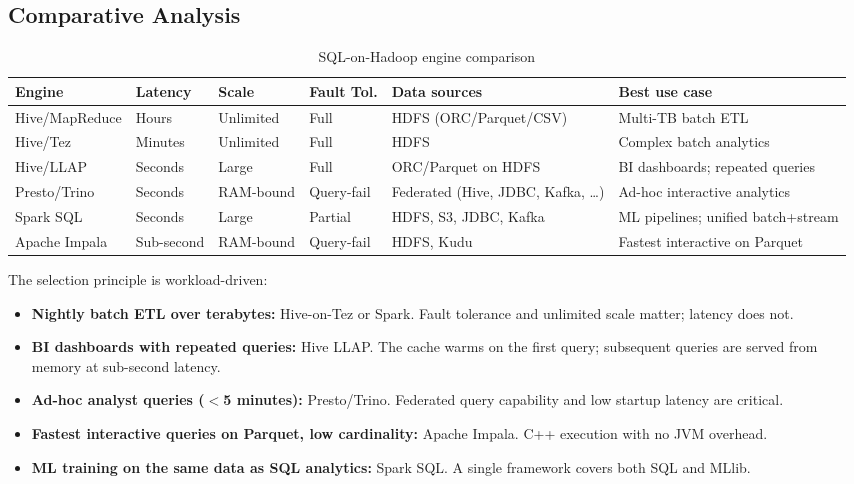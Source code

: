 \subsection{Comparative Analysis}
\label{subsec:engine-comparison}

\begin{table}[h!t]
\centering
\caption{SQL-on-Hadoop engine comparison}
\label{tab:engine-comparison}
\renewcommand{\arraystretch}{1.6}
\begin{tabular}{L{1.8cm} L{1.7cm} L{1.5cm} L{1.8cm} L{2.0cm} L{2.2cm}}
\toprule
\textbf{Engine} & \textbf{Latency} & \textbf{Scale} & \textbf{Fault Tol.} & \textbf{Data sources} & \textbf{Best use case} \\
\midrule
Hive/MapReduce  & Hours     & Unlimited & Full       & HDFS (ORC/Parquet/CSV) & Multi-TB batch ETL \\
Hive/Tez        & Minutes   & Unlimited & Full       & HDFS                   & Complex batch analytics \\
Hive/LLAP       & Seconds   & Large     & Full       & ORC/Parquet on HDFS    & BI dashboards; repeated queries \\
Presto/Trino    & Seconds   & RAM-bound & Query-fail & Federated (Hive, JDBC, Kafka, \ldots) & Ad-hoc interactive analytics \\
Spark SQL       & Seconds   & Large     & Partial    & HDFS, S3, JDBC, Kafka  & ML pipelines; unified batch+stream \\
Apache Impala   & Sub-second & RAM-bound & Query-fail & HDFS, Kudu             & Fastest interactive on Parquet \\
\bottomrule
\end{tabular}
\end{table}

The selection principle is workload-driven:
\begin{itemize}
  \item \textbf{Nightly batch ETL over terabytes:} Hive-on-Tez or Spark.
        Fault tolerance and unlimited scale matter; latency does not.
  \item \textbf{BI dashboards with repeated queries:} Hive LLAP.
        The cache warms on the first query; subsequent queries are served
        from memory at sub-second latency.
  \item \textbf{Ad-hoc analyst queries ($<$5 minutes):} Presto/Trino.
        Federated query capability and low startup latency are critical.
  \item \textbf{Fastest interactive queries on Parquet, low cardinality:}
        Apache Impala. C++ execution with no JVM overhead.
  \item \textbf{ML training on the same data as SQL analytics:} Spark SQL.
        A single framework covers both SQL and MLlib.
\end{itemize}

